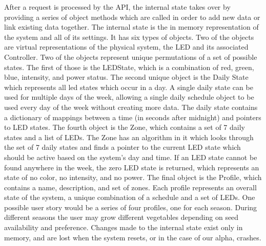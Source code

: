 \documentclass[onecolumn, draftclsnofoot,10pt, compsoc]{IEEEtran}
\begin{document}
	After a request is processed by the API, the internal state takes over by providing a series of object methods which are called in order to add new data or link existing data together.
	The internal state is the in memory representation of the system and all of its settings.
	It has six types of objects. Two of the objects are virtual representations of the physical system, the LED and its associated Controller.
	Two of the objects represent unique permutations of a set of possible states. The first of those is the LEDState, which is a combination of red, green, blue, intensity, and power status.
	The second unique object is the Daily State which represents all led states which occur in a day.
	A single daily state can be used for multiple days of the week, allowing a single daily schedule object to be used every day of the week without creating more data.
	The daily state contains a dictionary of mappings between a time (in seconds after midnight) and pointers to LED states.
	The fourth object is the Zone, which contains a set of 7 daily states and a list of LEDs.
	The Zone has an algorithm in it which looks through the set of 7 daily states and finds a pointer to the current LED state which should be active based on the system's day and time.
	If an LED state cannot be found anywhere in the week, the zero LED state is returned, which represents an state of no color, no intensity, and no power.
	The final object is the Profile, which contains a name, description, and set of zones.
	Each profile represents an overall state of the system, a unique combination of a schedule and a set of LEDs.
	One possible user story would be a series of four profiles, one for each season.
	During different seasons the user may grow different vegetables depending on seed availability and preference. Changes made to the internal state exist only in memory, and are lost when the system resets, or in the case of our alpha, crashes.
\end{document}
